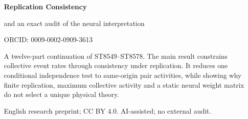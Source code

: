 \documentclass[11pt,a4paper]{article}
\begin{document}
\hypersetup{pageanchor=false}
\begin{titlepage}\centering\vspace*{18mm}
{\Huge\bfseries Replication Consistency\par}
\vspace{3mm}{\Huge\bfseries and Collective Activity\par}
\vspace{10mm}{\LARGE What FIN coupling laws do not yet select\par}
\vspace{5mm}{\Large A conditional rigidity theorem, sharp finite counterexamples,\par}
{\Large and an exact audit of the neural interpretation\par}
\vspace{12mm}{\Large Programmes ST8579--ST8590\par}
\vspace{10mm}{\Large Krzysztof \.Zuchowski\par}
\vspace{3mm}{Independent Researcher --- Fractal Information Theory Project\par}
{ORCID: 0009-0002-0909-3613\par}
\vspace{9mm}{6 September 2026\par}
\vfill
\begin{minipage}{.88\textwidth}
A twelve-part continuation of ST8549--ST8578. The main result constrains
collective event rates through consistency under replication. It reduces
one conditional independence test to same-origin pair activities, while
showing why finite replication, maximum collective activity and a static
neural weight matrix do not select a unique physical theory.
\end{minipage}
\vfill{\small English research preprint; CC BY 4.0. AI-assisted; no external audit.}
\end{titlepage}\hypersetup{pageanchor=true}
\end{document}
